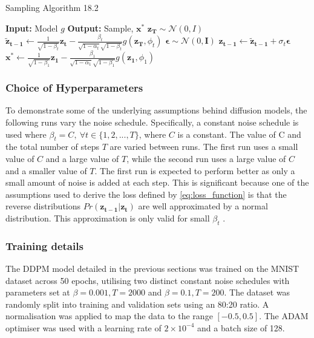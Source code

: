 \documentclass[11pt]{article}
\begin{document}
\begin{algorithm}
    \caption{Sampling Algorithm 18.2}
    \begin{algorithmic}[1]
    \State \textbf{Input:} Model $g$
    \State \textbf{Output:} Sample, $\mathbf{x^*}$
    \State $\mathbf{z_T} \sim \mathcal{N}(0, I)$ 
        \State $\mathbf{\tilde{z}_{t-1}} \gets \frac{1}{\sqrt{1-\beta_t}} \mathbf{z_t} - \frac{\beta_t}{\sqrt{1-\alpha_t}\sqrt{1-\beta_t}} g(\mathbf{z_T}, \phi_t)$ 
        \State $\boldsymbol{\epsilon} \sim \mathcal{N}(0, \mathbf{I})$ 
        \State $\mathbf{z_{t-1}} \gets \mathbf{\tilde{z}_{t-1}} + \sigma_t
        \boldsymbol{\epsilon}$ 
    \EndFor
    \State $\mathbf{x^*} \gets \frac{1}{\sqrt{1-\beta_1}} \mathbf{z_1}- \frac{\beta_1}{\sqrt{1-\alpha_1}\sqrt{1-\beta_1}} g(\mathbf{z_1}, \phi_1)$ 
    \end{algorithmic}
    \label{alg:sampling}
\end{algorithm}

\subsubsection{Choice of Hyperparameters}
To demonstrate some of the underlying assumptions behind diffusion models, the following runs vary the noise schedule.
Specifically, a constant noise schedule is used where $\beta_t = C, \ \forall t \in \{1,2,...,T\}$, where $C$ is a constant.
The value of C and the total number of steps $T$ are varied between runs. The first run uses a small value of $C$ and a large value of $T$, while the second run uses a large value of $C$ and a smaller value of $T$. The first run is expected to perform better as only a small amount of noise is added at each step. This is significant because one of the assumptions used to derive the loss defined by \ref{eq:loss_function} is that the reverse distributions $Pr(\mathbf{z_{t-1}}|\mathbf{z_{t}})$ are well approximated by a normal distribution. This approximation is only valid for small $\beta_t$ \cite{prince}.
\subsubsection{Training details}

The DDPM model detailed in the previous sections was trained on the MNIST dataset across 50 epochs, utilising two distinct constant noise schedules with parameters set at $\beta = 0.001, T=2000$ and $\beta=0.1, T=200$. The dataset was randomly split into training and validation sets using an 80:20 ratio. A normalisation was applied to map the data to the range $[-0.5, 0.5]$. The ADAM optimiser was used with a learning rate of $2 \times 10^{-4}$ and a batch size of 128.
\end{document}
